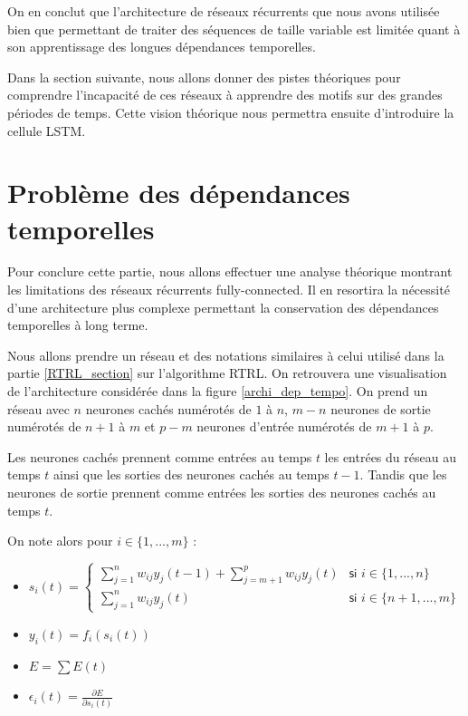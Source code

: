 On en conclut que l'architecture de réseaux récurrents que nous avons utilisée bien que permettant de traiter des séquences de taille variable est limitée quant à son apprentissage des longues dépendances temporelles.

Dans la section suivante, nous allons donner des pistes théoriques pour comprendre l'incapacité de ces réseaux à apprendre des motifs sur des grandes périodes de temps. Cette vision théorique nous permettra ensuite d'introduire la cellule LSTM.

\section{Problème des dépendances temporelles}

\label{dependances_temporelles}

Pour conclure cette partie, nous allons effectuer une analyse théorique montrant les limitations des réseaux récurrents fully-connected. Il en resortira la nécessité d'une architecture plus complexe permettant la conservation des dépendances temporelles à long terme.

Nous allons prendre un réseau et des notations similaires à celui utilisé dans la partie \ref{RTRL_section} sur l'algorithme RTRL. On retrouvera une visualisation de l'architecture considérée dans la figure \ref{archi_dep_tempo}. On prend un réseau avec $n$ neurones cachés numérotés de $1$ à $n$, $m - n$ neurones de sortie numérotés de $n+1$ à $m$ et $p - m$ neurones d'entrée numérotés de $m+1$ à $p$.

Les neurones cachés prennent comme entrées au temps $t$ les entrées du réseau au temps $t$ ainsi que les sorties des neurones cachés au temps $t-1$. Tandis que les neurones de sortie prennent comme entrées les sorties des neurones cachés au temps $t$.

On note alors pour $i \in \{1, ..., m\}$ :
\begin{itemize}
	\item $s_i(t) = \left\{
    \begin{array}{ll}
        \sum_{j = 1}^{n}{w_{ij}y_j(t-1)} + \sum_{j = m+1}^{p}{w_{ij}y_j(t)} & \textsf{si } i \in \{1, ..., n\} \\
        \sum_{j = 1}^{n}{w_{ij}y_j(t)} & \textsf{si } i \in \{n+1, ..., m\}
    \end{array}
\right.$
	\item $y_i(t) = f_i(s_i(t))$
	\item $E = \sum{E(t)}$
	\item $\epsilon_i(t) = \frac{\partial E}{\partial s_i(t)}$
\end{itemize}

